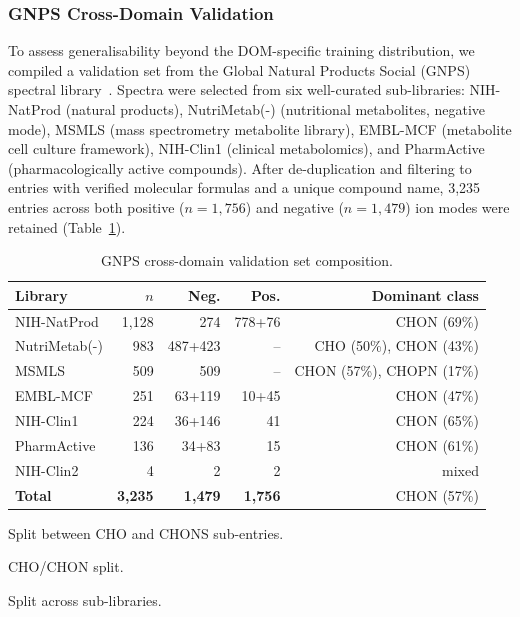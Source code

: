 \documentclass[journal=jcisd8]{achemso}
\begin{document}
\subsubsection{GNPS Cross-Domain Validation}

To assess generalisability beyond the DOM-specific training distribution, we compiled a
validation set from the Global Natural Products Social (GNPS) spectral library~\cite{Wang2016}.
Spectra were selected from six well-curated sub-libraries: NIH-NatProd
(natural products), NutriMetab(-) (nutritional metabolites, negative mode),
MSMLS (mass spectrometry metabolite library), EMBL-MCF (metabolite cell culture framework),
NIH-Clin1 (clinical metabolomics), and PharmActive (pharmacologically active compounds).
After de-duplication and filtering to entries with verified molecular formulas and a unique
compound name, 3,235 entries across both positive ($n=1,756$) and negative ($n=1,479$) ion
modes were retained (Table~\ref{tab:gnps_dataset}).

\begin{table}[H]
\centering
\small
\begin{threeparttable}
\caption{GNPS cross-domain validation set composition.}
\label{tab:gnps_dataset}
\footnotesize
\begin{tabular}{lrrrr}
\toprule
\textbf{Library} & \textbf{$n$} & \textbf{Neg.} & \textbf{Pos.} & \textbf{Dominant class} \\
\midrule
NIH-NatProd      & 1{,}128 & 274 & 778+76\tnote{a} & CHON (69\%) \\
NutriMetab(-)    & 983   & 487+423\tnote{b} & --  & CHO (50\%), CHON (43\%) \\
MSMLS            & 509   & 509 & --  & CHON (57\%), CHOPN (17\%) \\
EMBL-MCF         & 251   & 63+119\tnote{c} & 10+45\tnote{c} & CHON (47\%) \\
NIH-Clin1        & 224   & 36+146\tnote{c} & 41 & CHON (65\%) \\
PharmActive      & 136   & 34+83\tnote{c} & 15 & CHON (61\%) \\
NIH-Clin2        & 4     & 2 & 2 & mixed \\
\midrule
\textbf{Total}   & \textbf{3{,}235} & \textbf{1{,}479} & \textbf{1{,}756} & CHON (57\%) \\
\bottomrule
\end{tabular}
\begin{tablenotes}
\footnotesize
\item[\textit{a}] Split between CHO and CHONS sub-entries.
\item[\textit{b}] CHO/CHON split.
\item[\textit{c}] Split across sub-libraries.
\end{tablenotes}
\end{threeparttable}
\end{table}
\end{document}
